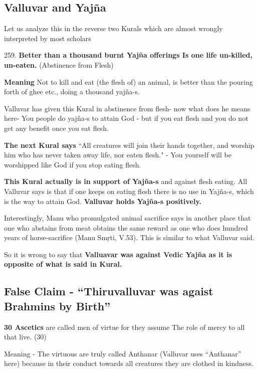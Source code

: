 \subsection*{Valluvar and Yajña}

Let us analyze this in the reverse two Kurals which are almost wrongly interpreted by most scholars

259. \textbf{Better than a thousand burnt Yajña offerings Is one life un-killed, un-eaten.} (Abstinence from Flesh)

\textbf{Meaning} Not to kill and eat (the flesh of) an animal, is better than the pouring forth of ghee etc., doing a thousand yajña-s.

Valluvar has given this Kural in abstinence from flesh- now what does he means here- You people do yajña-s to attain God - but if you eat flesh and you do not get any benefit once you eat flesh.

\textbf{The next Kural says} “All creatures will join their hands together, and worship him who has never taken away life, nor eaten flesh." - You yourself will be worshipped like God if you stop eating flesh.

\textbf{This Kural actually is in support of Yajña-s} and against flesh eating. All Valluvar says is that if one keeps on eating flesh there is no use in Yajña-s, which is the way to attain God. \textbf{Valluvar holds Yajña-s positively.}

Interestingly, Manu who promulgated animal sacrifice says in another place that one who abstains from meat obtains the same reward as one who does hundred years of horse-sacrifice (Manu Smŗti, V.53). This is similar to what Valluvar said.

So it is wrong to say that \textbf{Valluavar was against Vedic Yajña as it is opposite of what is said in Kural.}


\subsection*{False Claim - “Thiruvalluvar was agaist Brahmins by Birth”}

\textbf{30 Ascetics} are called men of virtue for they assume The role of mercy to all that live. (30)

Meaning - The virtuous are truly called Anthanar (Valluvar uses “Anthanar” here) because in their conduct towards all creatures they are clothed in kindness.

